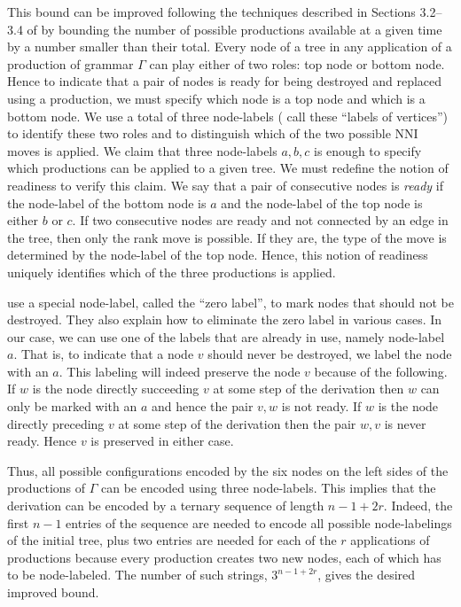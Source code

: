 \documentclass[11pt]{amsart}
\theoremstyle{definition}
\newcommand{\nni}{\mathrm{NNI}}
\begin{document}
This bound can be improved following the techniques described in Sections 3.2--3.4 of \autocite[][see also Section 5]{Sleator1992-bp} by bounding the number of possible productions available at a given time by a number smaller than their total.
Every node of a tree in any application of a production of grammar $\Gamma$ can play either of two roles: top node or bottom node.
Hence to indicate that a pair of nodes is ready for being destroyed and replaced using a production, we must specify which node is a top node and which is a bottom node.
We use a total of three node-labels (\textcite{Sleator1992-bp} call these ``labels of vertices'') to identify these two roles and to distinguish which of the two possible $\nni$ moves is applied.
We claim that three node-labels $a, b, c$ is enough to specify which productions can be applied to a given tree.
We must redefine the notion of readiness to verify this claim.
We say that a pair of consecutive nodes is \emph{ready} if the node-label of the bottom node is $a$ and the node-label of the top node is either $b$ or $c$.
If two consecutive nodes are ready and not connected by an edge in the tree, then only the rank move is possible.
If they are, the type of the move is determined by the node-label of the top node.
Hence, this notion of readiness uniquely identifies which of the three productions is applied.

\textcite{Sleator1992-bp} use a special node-label, called the ``zero label'', to mark nodes that should not be destroyed.
They also explain how to eliminate the zero label in various cases.
In our case, we can use one of the labels that are already in use, namely node-label $a$.
That is, to indicate that a node $v$ should never be destroyed, we label the node with an $a$.
This labeling will indeed preserve the node $v$ because of the following.
If $w$ is the node directly succeeding $v$ at some step of the derivation then $w$ can only be marked with an $a$ and hence the pair $v, w$ is not ready.
If $w$ is the node directly preceding $v$ at some step of the derivation then the pair $w, v$ is never ready.
Hence $v$ is preserved in either case.

Thus, all possible configurations encoded by the six nodes on the left sides of the productions of $\Gamma$ can be encoded using three node-labels.
This implies that the derivation can be encoded by a ternary sequence of length $n-1+2r$.
Indeed, the first $n-1$ entries of the sequence are needed to encode all possible node-labelings of the initial tree, plus two entries are needed for each of the $r$ applications of productions because every production creates two new nodes, each of which has to be node-labeled.
The number of such strings, $3^{n-1+2r}$, gives the desired improved bound.
\end{document}
